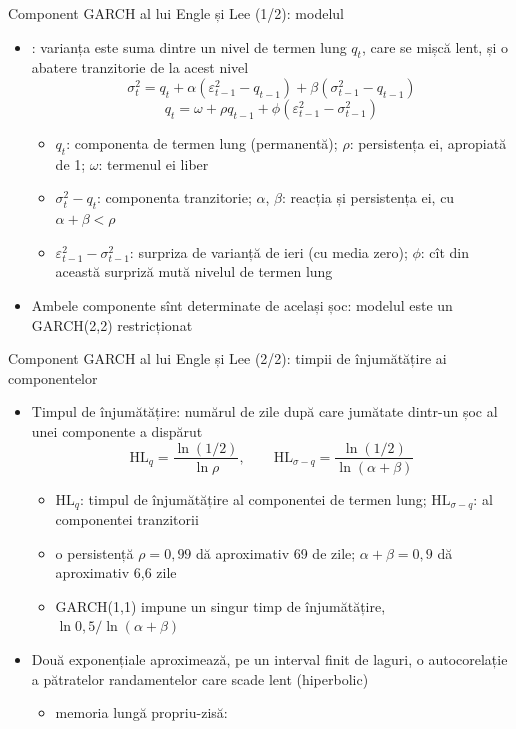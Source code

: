 \begin{frame}{Component GARCH al lui Engle și Lee (1/2): modelul}
\itemsize{\small}
\begin{itemize}
    \item {}: varianța este suma dintre un nivel de termen lung $q_t$, care se mișcă lent, și o abatere tranzitorie de la acest nivel
    \[ \sigma^2_t = q_t + \alpha(\varepsilon^2_{t-1} - q_{t-1}) + \beta(\sigma^2_{t-1} - q_{t-1}) \]
    \[ q_t = \omega + \rho q_{t-1} + \phi(\varepsilon^2_{t-1} - \sigma^2_{t-1}) \]
    \begin{itemize}
        \item $q_t$: componenta de termen lung (permanentă); $\rho$: persistența ei, apropiată de 1; $\omega$: termenul ei liber
        \item $\sigma^2_t - q_t$: componenta tranzitorie; $\alpha$, $\beta$: reacția și persistența ei, cu $\alpha + \beta < \rho$
        \item $\varepsilon^2_{t-1} - \sigma^2_{t-1}$: surpriza de varianță de ieri (cu media zero); $\phi$: cît din această surpriză mută nivelul de termen lung
    \end{itemize}
    \item Ambele componente sînt determinate de același șoc: modelul este un GARCH(2,2) restricționat
\end{itemize}
\end{frame}

\begin{frame}{Component GARCH al lui Engle și Lee (2/2): timpii de înjumătățire ai componentelor}
\itemsize{\small}
\begin{itemize}
    \item Timpul de înjumătățire: numărul de zile după care jumătate dintr-un șoc al unei componente a dispărut
    \[ \mathrm{HL}_q = \frac{\ln(1/2)}{\ln\rho}, \qquad \mathrm{HL}_{\sigma - q} = \frac{\ln(1/2)}{\ln(\alpha + \beta)} \]
    \begin{itemize}
        \item $\mathrm{HL}_q$: timpul de înjumătățire al componentei de termen lung; $\mathrm{HL}_{\sigma - q}$: al componentei tranzitorii
        \item o persistență $\rho = 0{,}99$ dă aproximativ 69 de zile; $\alpha + \beta = 0{,}9$ dă aproximativ 6,6 zile
        \item GARCH(1,1) impune un singur timp de înjumătățire, $\ln 0{,}5/\ln(\alpha + \beta)$
    \end{itemize}
    \item Două exponențiale aproximează, pe un interval finit de laguri, o autocorelație a pătratelor randamentelor care scade lent (hiperbolic)
    \begin{itemize}
        \item memoria lungă propriu-zisă: 
    \end{itemize}
\end{itemize}
\end{frame}

